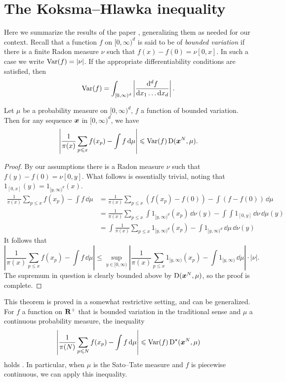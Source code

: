 \section{The Koksma--Hlawka inequality}

Here we summarize the results of the paper \cite{okten-1999}, generalizing them 
as needed for our context. Recall that a function $f$ on $[0,\infty)^d$ is 
said to be of \emph{bounded variation} if there is a finite Radon measure $\nu$ 
such that $f(x) - f(0) = \nu[0,x]$. In such a case we write 
$\operatorname{Var}(f) = |\nu|$. If the appropriate differentiability conditions are 
satisfied, then 
\[
	\operatorname{Var}(f) = \int_{[0,\infty)^d} \left|\frac{\mathrm{d}^d f}{\mathrm{d} x_1 \dots \mathrm{d} x_d} \right|.
\]

\begin{theorem}
Let $\mu$ be a probability measure on $[0,\infty)^d$, $f$ a function of 
bounded variation. Then for any sequence ${\boldsymbol x}$ in $[0,\infty)^d$, we have 
\[
	\left| \frac{1}{\pi(x)} \sum_{p\leqslant x} f(x_p) - \int f\, \mathrm{d}\mu \right| \leqslant \operatorname{Var}(f) \operatorname{D}({\boldsymbol x}^N,\mu) .
\]
\end{theorem}
\begin{proof}
By our assumptions there is a Radon measure $\nu$ such that 
$f(y) - f(0) = \nu[0,y]$. What follows is essentially trivial, noting that 
$1_{[0,x]}(y) = 1_{[y,\infty)^d}(x)$. 
\begin{align*}
	\frac{1}{\pi(x)} \sum_{p\leqslant x} f(x_p) - \int f\, \dd\mu 
		&= \frac{1}{\pi(x)} \sum_{p\leqslant x} \left(f(x_p) - f(0)\right) - \int \left(f - f(0)\right)\, \dd\mu \\
		&= \frac{1}{\pi(x)} \sum_{p\leqslant x} \int 1_{[y,\infty)^d}(x_p)\, \dd \nu(y) - \int \int 1_{[0,y]}\, \dd\nu \, \dd\mu(y) \\
		&= \int \frac{1}{\pi(x)} \sum_{p\leqslant x} 1_{[y,\infty)^d}(x_p) - \int 1_{[y,\infty)^d}\, \dd\mu \, \dd\nu(y)
\end{align*}
It follows that 
\[
	\left| \frac{1}{\pi(x)} \sum_{p\leqslant x} f(x_p) - \int f\, \dd\mu \right|
		\leqslant \sup_{y\in [0,\infty)} \left| \frac{1}{\pi(x)} \sum_{p\leqslant x} 1_{[y,\infty)}(x_p) - \int 1_{[y,\infty)}\, \dd\mu\right| \cdot |\nu| .
\]
The supremum in question is clearly bounded above by $\operatorname{D}({\boldsymbol x}^N,\mu)$, so the 
proof is complete. 
\end{proof}

This theorem is proved in a somewhat restrictive setting, and can be 
generalized. For $f$ a function on $\mathbf{R}^+$ that is bounded variation in 
the traditional sense and $\mu$ a continuous probability measure, the 
inequality 
\[
	\left| \frac{1}{\pi(N)} \sum_{p\leqslant N} f(x_p) - \int f\, \mathrm{d}\mu\right| \leqslant \operatorname{Var}(f) \operatorname{D}^\star({\boldsymbol x}^N,\mu) 
\]
holds \cite[Ch.~2, Th.~5.1]{kuipers-niederreiter-1974}. In particular, when 
$\mu$ is the Sato--Tate measure and $f$ is piecewise continuous, we can apply 
this inequality. 





